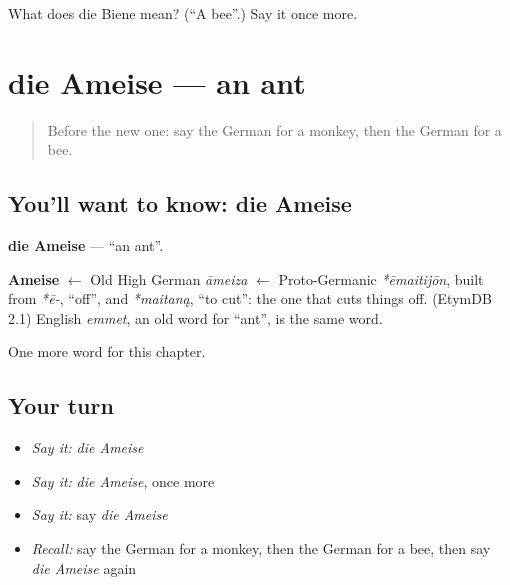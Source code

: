 \begin{tcolorbox}[breakable,colback=teal!4,colframe=teal!35!black,title={Before you move on}]
What does die Biene mean? (\textquotedblleft{}A bee\textquotedblright{}.) Say it once more.
\end{tcolorbox}
\section[die Ameise]{die Ameise — an ant}

\label{lesson:GE-C88-ameise}



\begin{quote}
Before the new one: say the German for a monkey, then the German for a bee.
\end{quote}

\subsection*{You'll want to know: die Ameise}
\textbf{die Ameise} — \textquotedblleft{}an ant\textquotedblright{}.

\begin{cousinweb}
\textbf{Ameise} $\leftarrow$ Old High German \emph{āmeiza} $\leftarrow$ Proto-Germanic \emph{*ēmaitijōn}, built from \emph{*ē-}, \textquotedblleft{}off\textquotedblright{}, and \emph{*maitaną}, \textquotedblleft{}to cut\textquotedblright{}: the one that cuts things off. (EtymDB 2.1) English \emph{emmet}, an old word for \textquotedblleft{}ant\textquotedblright{}, is the same word.
\end{cousinweb}

\begin{grammarlens}[title={What you've built}]
One more word for this chapter.
\end{grammarlens}

\subsection*{Your turn}
\begin{itemize}
\raggedright
  \item \emph{Say it:} \emph{die Ameise}
  \item \emph{Say it:} \emph{die Ameise}, once more
  \item \emph{Say it:} say \emph{die Ameise}
  \item \emph{Recall:} say the German for a monkey, then the German for a bee, then say \emph{die Ameise} again
\end{itemize}

